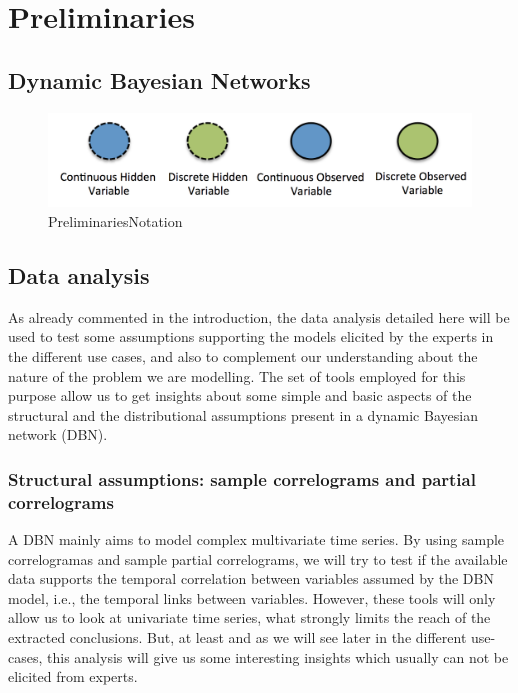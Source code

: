 \section{Preliminaries}\label{Section:Preliminaries}

\subsection{Dynamic Bayesian Networks}

\begin{figure}
\begin{center}
\includegraphics[scale=0.4]{./figures/PreliminariesNotation}
\caption{\label{Figure:Preliminaries Notation}PreliminariesNotation
}
\end{center}
\end{figure}

\subsection{Data analysis}

As already commented in the introduction, the data analysis detailed here will be used to test some assumptions supporting the models elicited by the experts in the different use cases, and also to complement our understanding about the nature of the problem we are modelling. The set of tools employed for this purpose allow us to get insights about some simple and basic aspects of the structural and the distributional assumptions present in a dynamic Bayesian network (DBN).

\subsubsection*{Structural assumptions: sample correlograms and partial correlograms}

A DBN mainly aims to model complex multivariate time series. By using sample correlogramas and sample partial correlograms, we will try to test if the available data supports the temporal correlation between variables assumed by the DBN model, i.e., the temporal links between variables. However, these tools will only allow us to look at univariate time series, what strongly limits the reach of the  extracted conclusions. But, at least and as we will see later in the different use-cases, this analysis will give us some interesting insights which usually can not be elicited from experts.  

